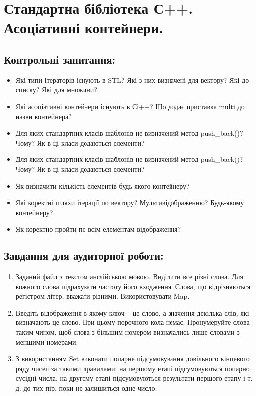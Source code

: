 \documentclass[a5paper,titlepage,openany,twoside,draft]{book_unv}%
\begin{document}
\chapter{Стандартна бібліотека С++. Асоціативні контейнери.}
%

\section{Контрольні запитання:}
\begin{itemize}
\item
Які типи ітераторів існують в STL? Які з них визначені для вектору? Які
до списку? Які для множини?
\item
Які асоціативні контейнери існують в Сі++? Що додає приставка multi до
назви контейнера?
\item
Для яких стандартних класів-шаблонів не визначений метод push\_back()?
Чому? Як в ці класи додаються елементи?
\item
Для яких стандартних класів-шаблонів не визначений метод push\_back()?
Чому? Як в ці класи додаються елементи?
\item
Як визначити кількість елементів будь-якого контейнеру?
\item
Які коректні шляхи ітерації по вектору? Мультивідображенню? Будь-якому
контейнеру?
\item
Як коректно пройти по всім елементам відображення?
\end{itemize}

\section{Завдання для аудиторної роботи:}

\begin{enumerate}
\def\labelenumi{\arabic{enumi})}
\item
  Заданий файл з текстом англійською мовою. Виділити все різні слова.
  Для кожного слова підрахувати частоту його входження. Слова, що
  відрізняються регістром літер, вважати різними. Використовувати Map.
\item
  Введіть відображення в якому ключ -- це слово, а значення декілька
  слів, які визначають це слово. При цьому порочного кола немає.
  Пронумеруйте слова таким чином, щоб слова з більшим номером
  визначались лише словами з меншими номерами.
\item
  З використанням Set виконати попарне підсумовування довільного
  кінцевого ряду чисел за такими правилами: на першому етапі
  підсумовуються попарно сусідні числа, на другому етапі підсумовуються
  результати першого етапу і т. д. до тих пір, поки не залишиться одне
  число.
\end{enumerate}
\end{document}
